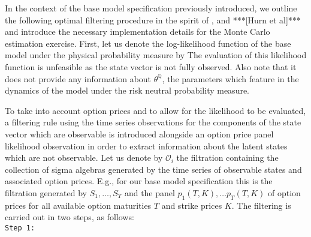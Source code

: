 \documentclass[11pt,a4paper,notitlepage]{article}
\numberwithin{equation}{section}
\begin{document}
In the context of the base model specification previously introduced, we outline the following optimal filtering procedure in the spirit of \citet{johannes2009optimal}, \citet{christoffersen2010volatility} and ***[Hurn et al]*** and introduce the necessary implementation details for the Monte Carlo estimation exercise. First, let us denote the  log-likelihood function of the base model under the physical probability measure by
The evaluation of this likelihood function is unfeasible as the state vector is not fully observed. Also note that it does not provide any information about $\theta^\mathbb{Q}$, the parameters which feature in the dynamics of the model under the risk neutral probability measure.
 
To take into account option prices and to allow for the likelihood to be evaluated, a filtering rule using the time series observations for the components of the state vector which are observable is introduced alongside an option price panel likelihood observation in order to extract information about the latent states which are not observable.  Let us denote by $\mathcal{O}_i$ the filtration containing the collection of sigma algebras generated by the time series of observable states and associated option prices. E.g., for our base model specification this is the filtration generated by $S_{1},\dots,S_{T}$ and the panel $p_{1}(T,K),\dots  p_{T}(T,K)$ of option prices for all available option maturities $T$ and strike prices $K$. The filtering is carried out in two steps, as follows:\vspace{+5pt}\\
\texttt{Step 1:~~~}\vspace{-5pt}
\end{document}
